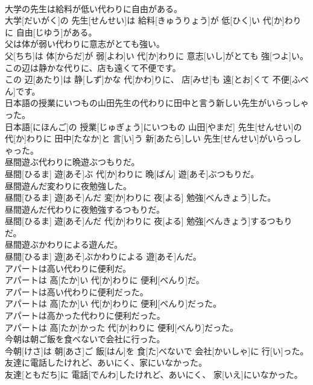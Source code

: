 \documentclass[8pt]{extreport}
\begin{document}
\begin{CJK}{UTF8}{min}
\\	大学の先生は給料が低い代わりに自由がある。	
\\	大学[だいがく]の 先生[せんせい]は 給料[きゅうりょう]が 低[ひく]い 代[か]わりに 自由[じゆう]がある。
\\	父は体が弱い代わりに意志がとても強い。	
\\	父[ちち]は 体[からだ]が 弱[よわ]い 代[か]わりに 意志[いし]がとても 強[つよ]い。
\\	この辺は静かな代りに、店も遠くて不便です。	
\\	この 辺[あたり]は 静[しず]かな 代[かわ]りに、 店[みせ]も 遠[とお]くて 不便[ふべん]です。
\\	日本語の授業にいつもの山田先生の代わりに田中と言う新しい先生がいらっしゃった。	
\\	日本語[にほんご]の 授業[じゅぎょう]にいつもの 山田[やまだ] 先生[せんせい]の 代[か]わりに 田中[たなか]と 言[い]う 新[あたら]しい 先生[せんせい]がいらっしゃった。
\\	昼間遊ぶ代わりに晩遊ぶつもりだ。	
\\	昼間[ひるま] 遊[あそ]ぶ 代[か]わりに 晩[ばん] 遊[あそ]ぶつもりだ。
\\	昼間遊んだ変わりに夜勉強した。	
\\	昼間[ひるま] 遊[あそ]んだ 変[か]わりに 夜[よる] 勉強[べんきょう]した。
\\	昼間遊んだ代わりに夜勉強するつもりだ。	
\\	昼間[ひるま] 遊[あそ]んだ 代[か]わりに 夜[よる] 勉強[べんきょう]するつもりだ。
\\	昼間遊ぶかわりによる遊んだ。	
\\	昼間[ひるま] 遊[あそ]ぶかわりによる 遊[あそ]んだ。
\\	アパートは高い代わりに便利だ。	
\\	アパートは 高[たか]い 代[か]わりに 便利[べんり]だ。
\\	アパートは高い代わりに便利だった。	
\\	アパートは 高[たか]い 代[か]わりに 便利[べんり]だった。
\\	アパートは高かった代わりに便利だった。	
\\	アパートは 高[たか]かった 代[か]わりに 便利[べんり]だった。
\\	今朝は朝ご飯を食べないで会社に行った。	
\\	今朝[けさ]は 朝[あさ]ご 飯[はん]を 食[た]べないで 会社[かいしゃ]に 行[い]った。
\\	友達に電話したけれど、あいにく、家にいなかった。	
\\	友達[ともだち]に 電話[でんわ]したけれど、あいにく、 家[いえ]にいなかった。

\end{CJK}
\end{document}
